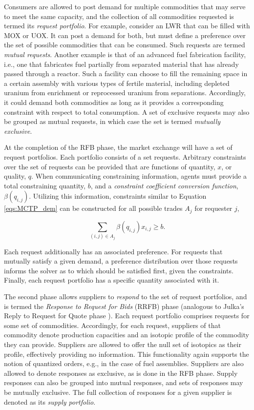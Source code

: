 Consumers are allowed to post demand for multiple commodities that may serve to
meet the same capacity, and the collection of all commodities requested is
termed its \textit{request portfolio}. For example, consider an LWR that can be
filled with MOX or UOX. It can post a demand for both, but must define a
preference over the set of possible commodities that can be consumed. Such
requests are termed \textit{mutual requests}. Another example is that of an
advanced fuel fabrication facility, i.e., one that fabricates fuel partially
from separated material that has already passed through a reactor. Such a
facility can choose to fill the remaining space in a certain assembly with
various types of fertile material, including depleted uranium from enrichment or
reprocessed uranium from separations. Accordingly, it could demand both
commodities as long as it provides a corresponding constraint with respect to
total consumption. A set of exclusive requests may also be grouped as mutual
requests, in which case the set is termed \textit{mutually exclusive}.

At the completion of the RFB phase, the market exchange will have a set of
request portfolios. Each portfolio consists of a set requests. Arbitrary
constraints over the set of requests can be provided that are functions of
quantity, $x$, or quality, $q$.  When communicating constraining information,
agents must provide a total constraining quantity, $b$, and a \textit{constraint
  coefficient conversion function}, $\beta (q_{i, j})$. Utilizing this
information, constraints similar to Equation \ref{eqs:MCTP_dem} can be
constructed for all possible trades $A_j$ for requester $j$,

\begin{equation}\label{meth:constr}
  \sum_{(i, j) \in A_j} \beta (q_{i,j}) x_{i, j} \geq b.
\end{equation}

\noindent
Each request additionally has an associated preference. For requests that
mutually satisfy a given demand, a preference distribution over those requests
informs the solver as to which should be satisfied first, given the
constraints. Finally, each request portfolio has a specific quantity associated
with it.

The second phase allows suppliers to \textit{respond} to the set of request
portfolios, and is termed the \textit{Response to Request for Bids} (RRFB) phase
(analogous to Julka's Reply to Request for Quote phase
\cite{julka_agent-based_2002}). Each request portfolio comprises requests
for some set of commodities. Accordingly, for each request, suppliers of that
commodity denote production capacities and an isotopic profile of the commodity
they can provide. Suppliers are allowed to offer the null set of isotopics as
their profile, effectively providing no information. 
This functionality again supports the notion of quantized orders,
e.g., in the case of fuel assemblies. 
Suppliers are also allowed
to denote responses as exclusive, as is done in the RFB phase. Supply responses
can also be grouped into mutual responses, and sets of responses may be mutually
exclusive. The full collection of responses for a
given supplier is denoted as its \textit{supply portfolio}.

